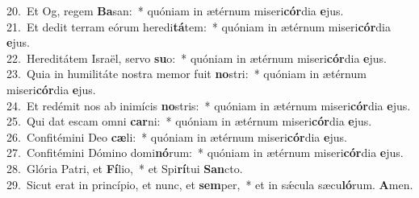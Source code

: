 {20.~}Et Og, regem \textbf{Ba}san:~* quóniam in ætérnum miseri\textbf{cór}dia \textbf{e}jus.\\
{21.~}Et dedit terram eórum heredi\textbf{tá}tem:~* quóniam in ætérnum miseri\textbf{cór}dia \textbf{e}jus.\\
{22.~}Hereditátem Israël, servo \textbf{su}o:~* quóniam in ætérnum miseri\textbf{cór}dia \textbf{e}jus.\\
{23.~}Quia in humilitáte nostra memor fuit \textbf{no}stri:~* quóniam in ætérnum miseri\textbf{cór}dia \textbf{e}jus.\\
{24.~}Et redémit nos ab inimícis \textbf{no}stris:~* quóniam in ætérnum miseri\textbf{cór}dia \textbf{e}jus.\\
{25.~}Qui dat escam omni \textbf{car}ni:~* quóniam in ætérnum miseri\textbf{cór}dia \textbf{e}jus.\\
{26.~}Confitémini Deo \textbf{cæ}li:~* quóniam in ætérnum miseri\textbf{cór}dia \textbf{e}jus.\\
{27.~}Confitémini Dómino domi\textbf{nó}rum:~* quóniam in ætérnum miseri\textbf{cór}dia \textbf{e}jus.\\
{28.~}Glória Patri, et \textbf{Fí}lio,~* et Spi\textbf{rí}tui \textbf{San}cto.\\
{29.~}Sicut erat in princípio, et nunc, et \textbf{sem}per,~* et in sǽcula sæcu\textbf{ló}rum. \textbf{A}men.\\
